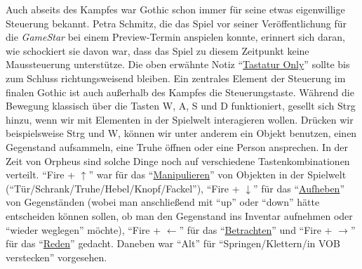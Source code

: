 \documentclass[12pt]{scrbook}
\begin{document}
Auch abseits des Kampfes war Gothic schon immer für seine etwas eigenwillige Steuerung bekannt.
Petra Schmitz, die das Spiel vor seiner Veröffentlichung für die \textit{GameStar} bei einem Preview-Termin anspielen konnte, erinnert sich daran, wie schockiert sie davon war, dass das Spiel zu diesem Zeitpunkt keine Maussteuerung unterstütze.\autocite{schmitz_maussteuerung}
Die oben erwähnte Notiz \enquote{\uline{Tastatur Only}}\autocite[S.~1]{orpheus_interface} sollte bis zum Schluss richtungsweisend bleiben.
Ein zentrales Element der Steuerung im finalen Gothic ist auch außerhalb des Kampfes die Steuerungstaste.
Während die Bewegung klassisch über die Tasten W, A, S und D funktioniert, gesellt sich Strg hinzu, wenn wir mit Elementen in der Spielwelt interagieren wollen.
Drücken wir beispielsweise Strg und W, können wir unter anderem ein Objekt benutzen, einen Gegenstand aufsammeln, eine Truhe öffnen oder eine Person ansprechen.
In der Zeit von Orpheus sind solche Dinge noch auf verschiedene Tastenkombinationen verteilt.
\enquote{Fire + $\uparrow$} war für das \enquote{\uline{Manipulieren}} von Objekten in der Spielwelt (\enquote{Tür/Schrank/Truhe/Hebel/Knopf/Fackel}), \enquote{Fire + $\downarrow$} für das \enquote{\uline{Aufheben}} von Gegenständen (wobei man anschließend mit \enquote{up} oder \enquote{down} hätte entscheiden können sollen, ob man den Gegenstand ins Inventar aufnehmen oder \enquote{wieder weglegen} möchte), \enquote{Fire + $\leftarrow$} für das \enquote{\uline{Betrachten}} und \enquote{Fire + $\rightarrow$} für das \enquote{\uline{Reden}} gedacht.\autocite[S.~2]{orpheus_interface}
Daneben war \enquote{Alt} für \enquote{Springen/Klettern/in VOB verstecken} vorgesehen.\autocite[S.~3]{orpheus_interface}
\end{document}
